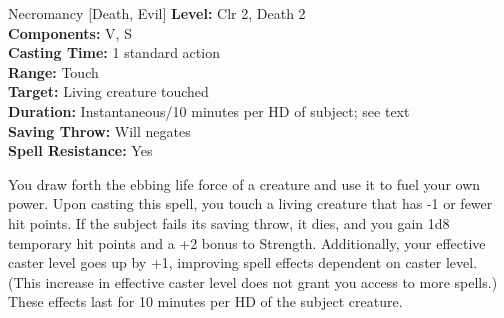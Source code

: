 {Necromancy [Death, Evil]}
{
	\textbf{Level:}
	Clr 2, Death 2\\
	\textbf{Components:}
	V, S\\
	\textbf{Casting Time:}
	1 standard action\\
	\textbf{Range:}
	Touch\\
	\textbf{Target:}
	Living creature touched\\
	\textbf{Duration:}
	Instantaneous/10 minutes per HD of subject; see text\\
	\textbf{Saving Throw:}
	Will negates\\
	\textbf{Spell Resistance:}
	Yes\\
}
{
	You draw forth the ebbing life force of a creature and use it to fuel your own power. Upon casting this spell, you touch a living creature that has -1 or fewer hit points. If the subject fails its saving throw, it dies, and you gain 1d8 temporary hit points and a +2 bonus to Strength. Additionally, your effective caster level goes up by +1, improving spell effects dependent on caster level. (This increase in effective caster level does not grant you access to more spells.) These effects last for 10 minutes per HD of the subject creature.

}
